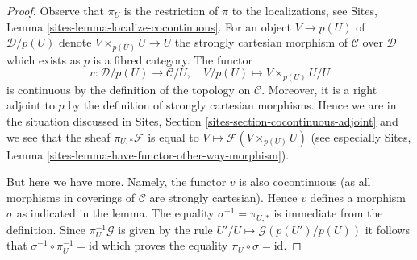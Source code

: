 \documentclass[10pt,a4paper]{amsart}
\theoremstyle{plain}
\theoremstyle{definition}
\theoremstyle{remark}
\numberwithin{equation}{subsection}
\begin{document}
\begin{proof}
Observe that $\pi_U$ is the restriction of $\pi$ to the localizations, see
Sites, Lemma \ref{sites-lemma-localize-cocontinuous}.
For an object $V \to p(U)$ of $\mathcal{D}/p(U)$ denote
$V \times_{p(U)} U \to U$ the strongly cartesian morphism of $\mathcal{C}$
over $\mathcal{D}$ which exists as $p$ is a fibred category.
The functor
$$
v : \mathcal{D}/p(U) \to \mathcal{C}/U,\quad
V/p(U) \mapsto V \times_{p(U)} U/U
$$
is continuous by the definition of the topology on $\mathcal{C}$.
Moreover, it is a right adjoint to $p$ by the definition of strongly
cartesian morphisms. Hence we are in the situation discussed in
Sites, Section \ref{sites-section-cocontinuous-adjoint}
and we see that the sheaf $\pi_{U, *}\mathcal{F}$
is equal to $V \mapsto \mathcal{F}(V \times_{p(U)} U)$
(see especially Sites, Lemma
\ref{sites-lemma-have-functor-other-way-morphism}).

\medskip\noindent
But here we have more. Namely, the functor $v$
is also cocontinuous (as all morphisms in coverings of $\mathcal{C}$ 
are strongly cartesian). Hence $v$ defines a morphism $\sigma$ as
indicated in the lemma. The equality $\sigma^{-1} = \pi_{U, *}$
is immediate from the definition. Since $\pi_U^{-1}\mathcal{G}$
is given by the rule $U'/U \mapsto \mathcal{G}(p(U')/p(U))$
it follows that $\sigma^{-1} \circ \pi_U^{-1} = \text{id}$
which proves the equality
$\pi_U \circ \sigma = \text{id}$.
\end{proof}
\end{document}
